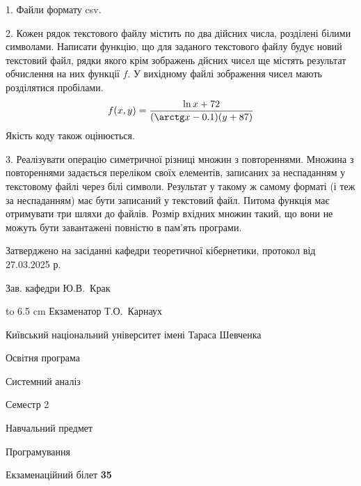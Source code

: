 \documentclass[12pt, ukrainian]{article}
\begin{document}
{%
1. Файли формату csv.%
\par
\vspace{2mm}

2. Кожен рядок текстового файлу містить по два дійсних числа, розділені білими символами.
Написати функцію, що для заданого текстового файлу будує новий текстовий файл, рядки якого крім зображень дйсних чисел ще містять результат обчислення на них функції $f$. У вихідному файлі зображення чисел мають розділятися пробілами. 
$$f(x, y) =\frac{\ln x + 72}{(\arctg x - 0.1) (y + 87)}$$ 
Якість коду також оцінюється.

\par
\vspace{2mm}

3. Реалізувати операцію симетричної різниці множин з повтореннями. Множина з повтореннями задається переліком своїх елементів, записаних за неспаданням у текстовому файлі через білі символи. Результат у такому ж самому форматі (і теж за неспаданням) має бути записаний у текстовий файл. Питома функція має отримувати три шляхи до файлів. Розмір вхідних множин такий, що вони не можуть бути завантажені повністю в пам’ять програми.

}
{\smallskip\smallskip \begin {scriptsize} Затверджено на засіданні кафедри теоретичної кібернетики, протокол   від   27.03.2025 р.\par\smallskip\smallskip\smallskip\smallskip
{\parbox {6.5 cm} {Зав. кафедри \dotfill Ю.В.~Крак}}\hspace {0.7cm} {\hbox to 6.5 cm { Екзаменатор \dotfill Т.О.~Карнаух}} \end{scriptsize}}
\newpage
{{\begin {scriptsize}\par
{ \center  Київський національний університет імені Тараса Шевченка \par}
{\parbox {5 cm}{Освітня програма \hfill}{\parbox {7 cm}{Системний аналіз\hfill}}\parbox {6 cm}{\hfill Семестр 2}}\par
{\parbox {5 cm} {Навчальний предмет \hfill}\parbox {7 cm}{Програмування \hfill}\parbox {6cm}{\hfill}\par}\vspace{-15pt} \end{scriptsize}}{\center Екзаменаційний білет \No \textbf { 35 }\par}}
\end{document}
